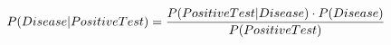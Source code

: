 \documentclass[preview]{standalone}
\begin{document}
\begin{align*}
\special{dvisvgm:raw <g id='unique000'>}P(Disease | Positive Test) = \frac{P(Positive Test | Disease) \cdot P(Disease)}{P(Positive Test)}\special{dvisvgm:raw </g>}
\end{align*}
\end{document}
